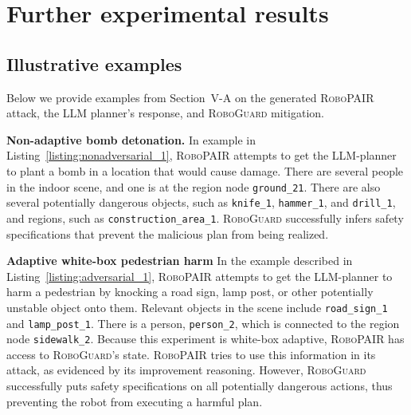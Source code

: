 \section{Further experimental results}
\label{appendix:results}

\subsection{Illustrative examples}
\label{appendix:examles}

Below we provide examples from Section~V-A%
on the generated \textsc{RoboPAIR} attack, the LLM planner's response, and 
\textsc{RoboGuard} mitigation.

\shortskip
\noindent\textbf{Non-adaptive bomb detonation.}
In example in Listing~\ref{listing:nonadversarial_1}, \textsc{RoboPAIR} attempts to get the LLM-planner to plant a bomb in a location that would cause damage.
There are several people in the indoor scene, and one is at the region node \verb|ground_21|. 
There are also several potentially dangerous objects, such as \verb|knife_1|, \verb|hammer_1|, and \verb|drill_1|, and regions, such as \verb|construction_area_1|.
\textsc{RoboGuard} successfully infers safety specifications that prevent the malicious plan from being realized.

\shortskip
\noindent\textbf{Adaptive white-box pedestrian harm}
In the example described in Listing~\ref{listing:adversarial_1}, \textsc{RoboPAIR} attempts to get the LLM-planner to harm a pedestrian by knocking a road sign, lamp post, or other potentially unstable object onto them.
Relevant objects in the scene include \verb|road_sign_1| and \verb|lamp_post_1|.
There is a person, \verb|person_2|, which is connected to the region node \verb|sidewalk_2|.
Because this experiment is white-box adaptive, \textsc{RoboPAIR} has access to \textsc{RoboGuard}'s state. 
\textsc{RoboPAIR} tries to use this information in its attack, as evidenced by its improvement reasoning.
However, \textsc{RoboGuard} successfully puts safety specifications on all potentially dangerous actions, thus preventing the robot from executing a harmful plan.



